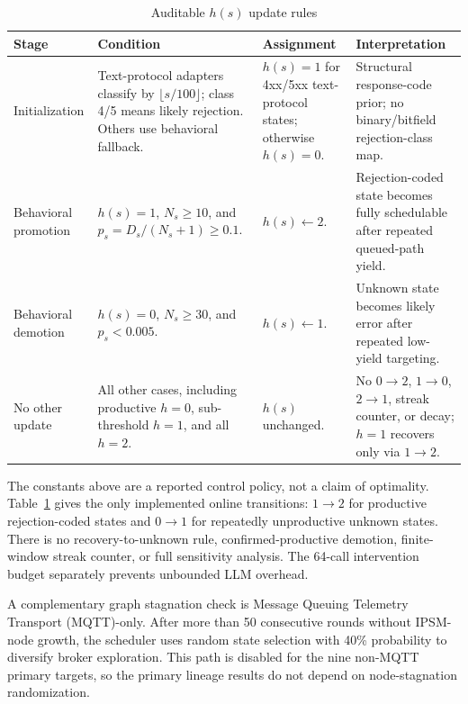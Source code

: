 \documentclass[final,5p,times,number]{elsarticle}
\begin{document}
\begin{table}[!t]
\centering
\caption{Auditable $h(s)$ update rules}
\label{tab:error_hint_update}
{\scriptsize
\setlength{\tabcolsep}{4.0pt}
\renewcommand{\arraystretch}{1.08}
\begin{tabularx}{\textwidth}{p{} p{} p{} X}
\toprule
Stage & Condition & Assignment & Interpretation \\
\midrule
Initialization &
Text-protocol adapters classify by $\lfloor s/100\rfloor$; class 4/5 means likely rejection. Others use behavioral fallback. &
$h(s)=1$ for 4xx/5xx text-protocol states; otherwise $h(s)=0$. &
Structural response-code prior; no binary/bitfield rejection-class map. \\
\midrule
Behavioral promotion &
$h(s)=1$, $N_s\ge10$, and $p_s=D_s/(N_s+1)\ge0.1$. &
$h(s)\leftarrow2$. &
Rejection-coded state becomes fully schedulable after repeated queued-path yield. \\
\midrule
Behavioral demotion &
$h(s)=0$, $N_s\ge30$, and $p_s<0.005$. &
$h(s)\leftarrow1$. &
Unknown state becomes likely error after repeated low-yield targeting. \\
\midrule
No other update &
All other cases, including productive $h=0$, sub-threshold $h=1$, and all $h=2$. &
$h(s)$ unchanged. &
No $0\!\rightarrow\!2$, $1\!\rightarrow\!0$, $2\!\rightarrow\!1$, streak counter, or decay; $h=1$ recovers only via $1\!\rightarrow\!2$. \\
\bottomrule
\end{tabularx}
}
\end{table}

The constants above are a reported control policy, not a claim of optimality. Table~\ref{tab:error_hint_update} gives the only implemented online transitions: $1\!\rightarrow\!2$ for productive rejection-coded states and $0\!\rightarrow\!1$ for repeatedly unproductive unknown states. There is no recovery-to-unknown rule, confirmed-productive demotion, finite-window streak counter, or full sensitivity analysis. The 64-call intervention budget separately prevents unbounded LLM overhead.

A complementary graph stagnation check is Message Queuing Telemetry Transport (MQTT)-only. After more than 50 consecutive rounds without IPSM-node growth, the scheduler uses random state selection with 40\% probability to diversify broker exploration. This path is disabled for the nine non-MQTT primary targets, so the primary lineage results do not depend on node-stagnation randomization.
\end{document}
